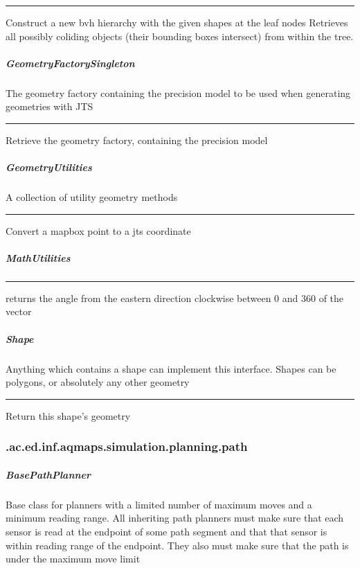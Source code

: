 \hrule
\begin{mitem}
\scriptsize
	{Construct a new bvh hierarchy with the given shapes at the leaf nodes}
	{Retrieves all possibly coliding objects (their bounding boxes intersect) from within the tree.}
\end{mitem}

\subparagraph{ GeometryFactorySingleton } The geometry factory containing the precision model to be used when generating geometries with JTS
 
\hrule
\begin{mitem}
\scriptsize
	{}
	{Retrieve the geometry factory, containing the precision model}
\end{mitem}

\subparagraph{ GeometryUtilities } A collection of utility geometry methods
 
\hrule
\begin{mitem}
\scriptsize
	{}
	{Convert a mapbox point to a jts coordinate}
\end{mitem}

\subparagraph{ MathUtilities } 
 
\hrule
\begin{mitem}
\scriptsize
	{}
	{returns the angle from the eastern direction clockwise between 0 and 360 of the vector}
\end{mitem}

\subparagraph{ Shape } Anything which contains a shape can implement this interface. Shapes can be polygons, or absolutely any other geometry
 
\hrule
\begin{mitem}
\scriptsize
	{Return this shape's geometry}
\end{mitem}

\subsubsection{ .ac.ed.inf.aqmaps.simulation.planning.path }
\subparagraph{ BasePathPlanner } Base class for planners with a limited number of maximum moves and a
 minimum reading range. All inheriting path planners must make sure that each sensor is read at the endpoint of some path segment
 and that that sensor is within reading range of the endpoint. They also must make sure that the path is under the maximum move limit
 
